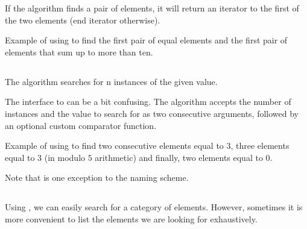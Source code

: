 
If the algorithm finds a pair of elements, it will return an iterator to the first of the two elements (end iterator otherwise).

\begin{box-note}
\footnotesize Example of using  to find the first pair of equal elements and the first pair of elements that sum up to more than ten.
\tcblower
{}
\end{box-note}

\subsection{\texorpdfstring{}{\texttt{std::search\_n}}}

The  algorithm searches for n instances of the given value.


The interface to  can be a bit confusing. The algorithm accepts the number of instances and the value to search for as two consecutive arguments, followed by an optional custom comparator function.

\begin{box-note}
\footnotesize Example of using  to find two consecutive elements equal to $3$, three elements equal to $3$ (in modulo $5$ arithmetic) and finally, two elements equal to $0$.
\tcblower
{}
\end{box-note}

Note that  is one exception to the  naming scheme.

\subsection{\texorpdfstring{}{\texttt{std::find\_first\_of}}}

Using , we can easily search for a category of elements. However, sometimes it is more convenient to list the elements we are looking for exhaustively.

